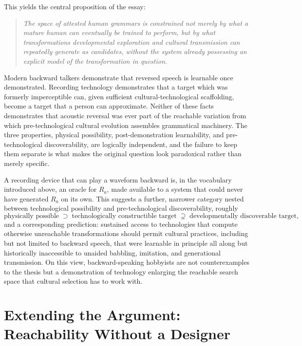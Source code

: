 \documentclass[11pt]{article}
\begin{document}
This yields the central proposition of the essay:

\begin{quote}
\emph{The space of attested human grammars is constrained not merely by what a mature human can eventually be trained to perform, but by what transformations developmental exploration and cultural transmission can repeatedly generate as candidates, without the system already possessing an explicit model of the transformation in question.}
\end{quote}

Modern backward talkers demonstrate that reversed speech is learnable once demonstrated. Recording technology demonstrates that a target which was formerly imperceptible can, given sufficient cultural-technological scaffolding, become a target that a person can approximate. Neither of these facts demonstrates that acoustic reversal was ever part of the reachable variation from which pre-technological cultural evolution assembles grammatical machinery. The three properties, physical possibility, post-demonstration learnability, and pre-technological discoverability, are logically independent, and the failure to keep them separate is what makes the original question look paradoxical rather than merely specific.

A recording device that can play a waveform backward is, in the vocabulary introduced above, an oracle for $R_a$, made available to a system that could never have generated $R_a$ on its own. This suggests a further, narrower category nested between technological possibility and pre-technological discoverability, roughly
\[
\text{physically possible} \;\supset\; \text{technologically constructible target} \;\supsetneq\; \text{developmentally discoverable target},
\]
and a corresponding prediction: sustained access to technologies that compute otherwise unreachable transformations should permit cultural practices, including but not limited to backward speech, that were learnable in principle all along but historically inaccessible to unaided babbling, imitation, and generational transmission. On this view, backward-speaking hobbyists are not counterexamples to the thesis but a demonstration of technology enlarging the reachable search space that cultural selection has to work with.

\section{Extending the Argument: Reachability Without a Designer}
\end{document}
